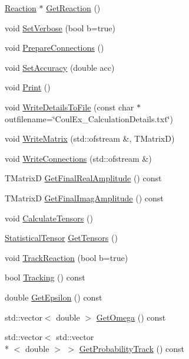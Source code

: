 \begin{DoxyCompactItemize}
\item 
\hyperlink{classReaction}{Reaction} $\ast$ \hyperlink{classPointCoulEx_a4369d10a2ab275ffd79800f4b2946345}{Get\-Reaction} ()
\item 
void \hyperlink{classPointCoulEx_afd63f7b47fc6fb5f49906911cb212b38}{Set\-Verbose} (bool b=true)
\item 
void \hyperlink{classPointCoulEx_a1bfa7f85286b1da3c4f0622ee35d0087}{Prepare\-Connections} ()
\item 
void \hyperlink{classPointCoulEx_a80b13791f6bfd42e2ab75895e1617ee3}{Set\-Accuracy} (double acc)
\item 
void \hyperlink{classPointCoulEx_aa6006da1bca6a0bc677c4fb23ba38dcd}{Print} ()
\item 
void \hyperlink{classPointCoulEx_a409e44329209abf7d2e4bfc794b2bb1e}{Write\-Details\-To\-File} (const char $\ast$outfilename=\char`\"{}Coul\-Ex\-\_\-\-Calculation\-Details.\-txt\char`\"{})
\item 
void \hyperlink{classPointCoulEx_aa7fa9cd089c327c59eef9ec4e7f46e0e}{Write\-Matrix} (std\-::ofstream \&, T\-Matrix\-D)
\item 
void \hyperlink{classPointCoulEx_a8786b398bd1d6d790f203c87cef957cc}{Write\-Connections} (std\-::ofstream \&)
\item 
T\-Matrix\-D \hyperlink{classPointCoulEx_aa53de9a5ae2bd43ef3b3287cffaccc67}{Get\-Final\-Real\-Amplitude} () const 
\item 
T\-Matrix\-D \hyperlink{classPointCoulEx_a13792d4d252f16cd4c1bb881757dea30}{Get\-Final\-Imag\-Amplitude} () const 
\item 
void \hyperlink{classPointCoulEx_a276ea0591ad200fbd40a53ac80c61634}{Calculate\-Tensors} ()
\item 
\hyperlink{classStatisticalTensor}{Statistical\-Tensor} \hyperlink{classPointCoulEx_a08232c7aba802b4820dc3859bf183a2e}{Get\-Tensors} ()
\item 
void \hyperlink{classPointCoulEx_aa03b7b60a372846b772659ff1b16c246}{Track\-Reaction} (bool b=true)
\item 
bool \hyperlink{classPointCoulEx_a65c1db61988871c76583e54d52b721ec}{Tracking} () const 
\item 
double \hyperlink{classPointCoulEx_a1e1d91eff35bba0a4ed36610a8644638}{Get\-Epsilon} () const 
\item 
std\-::vector$<$ double $>$ \hyperlink{classPointCoulEx_a2f447409074ae1105d54bcdf4aaad3fd}{Get\-Omega} () const 
\item 
std\-::vector$<$ std\-::vector\\*
$<$ double $>$ $>$ \hyperlink{classPointCoulEx_a5324fc5b5d28c980ae0919bb7de6bb02}{Get\-Probability\-Track} () const 
\end{DoxyCompactItemize}


